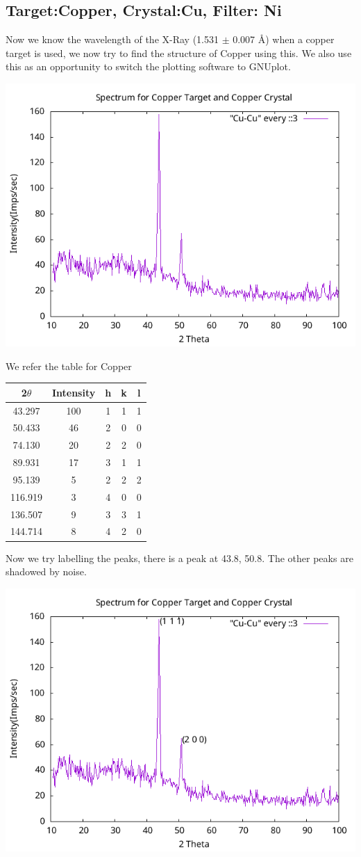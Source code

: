 \documentclass[]{report}[12 pt]
\begin{document}
\subsection*{Target:Copper, Crystal:Cu, Filter: Ni}
Now we know the wavelength of the X-Ray (1.531 $\pm$ 0.007 {\AA}) when a copper target is used, we now try to find the structure of Copper using this. We also use this as an opportunity to switch the plotting software to GNUplot.
\begin{center}
	\includegraphics[width=10 cm]{cucu.png}
\end{center}
We refer the table for Copper
\begin{center}
	\begin{tabular}{|c|c|c|c|c|}
		\hline
		2$\theta$ & Intensity & h & k & l \\
		\hline
		43.297 & 100 & 1 & 1 & 1 \\
		\hline
		50.433 & 46 & 2 & 0 & 0 \\
		\hline
		74.130 & 20 & 2 & 2 & 0 \\
		\hline
		89.931 & 17 & 3 & 1 & 1 \\
		\hline
		95.139 & 5 & 2 & 2 & 2 \\
		\hline
		116.919 & 3 & 4 & 0 & 0 \\
		\hline
		136.507 & 9 & 3 & 3 & 1 \\
		\hline
		144.714 & 8 & 4 & 2 & 0 \\
		\hline
	\end{tabular}
\end{center}
Now we try labelling the peaks, there is a peak at 43.8, 50.8. The other peaks are shadowed by noise.
\begin{center}
	\includegraphics[width=10 cm]{cucu1.png}
\end{center}
\end{document}
